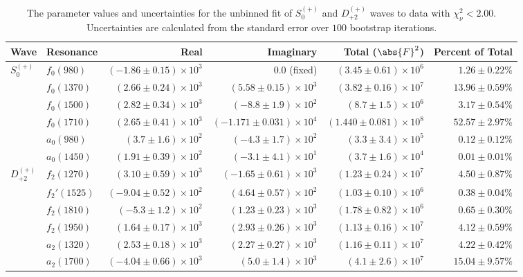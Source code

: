\begin{table}[ht]
    \begin{center}
        \begin{tabular}{llrrrr}\toprule
        Wave & Resonance & Real & Imaginary & Total ($\abs{F}^2$) & Percent of Total \\\midrule
$S_{0}^{(+)}$ & $f_{0}(980)$ & $(-1.86 \pm 0.15) \times 10^{3}$ & $0.0$ (fixed) & $(3.45 \pm 0.61) \times 10^{6}$ & $1.26 \pm 0.22 \%$ \\
 & $f_{0}(1370)$ & $(2.66 \pm 0.24) \times 10^{3}$ & $(5.58 \pm 0.15) \times 10^{3}$ & $(3.82 \pm 0.16) \times 10^{7}$ & $13.96 \pm 0.59 \%$ \\
 & $f_{0}(1500)$ & $(2.82 \pm 0.34) \times 10^{3}$ & $(-8.8 \pm 1.9) \times 10^{2}$ & $(8.7 \pm 1.5) \times 10^{6}$ & $3.17 \pm 0.54 \%$ \\
 & $f_{0}(1710)$ & $(2.65 \pm 0.41) \times 10^{3}$ & $(-1.171 \pm 0.031) \times 10^{4}$ & $(1.440 \pm 0.081) \times 10^{8}$ & $52.57 \pm 2.97 \%$ \\
 & $a_{0}(980)$ & $(3.7 \pm 1.6) \times 10^{2}$ & $(-4.3 \pm 1.7) \times 10^{2}$ & $(3.3 \pm 3.4) \times 10^{5}$ & $0.12 \pm 0.12 \%$ \\
 & $a_{0}(1450)$ & $(1.91 \pm 0.39) \times 10^{2}$ & $(-3.1 \pm 4.1) \times 10^{1}$ & $(3.7 \pm 1.6) \times 10^{4}$ & $0.01 \pm 0.01 \%$ \\
$D_{+2}^{(+)}$ & $f_{2}(1270)$ & $(3.10 \pm 0.59) \times 10^{3}$ & $(-1.65 \pm 0.61) \times 10^{3}$ & $(1.23 \pm 0.24) \times 10^{7}$ & $4.50 \pm 0.87 \%$ \\
 & $f_{2}'(1525)$ & $(-9.04 \pm 0.52) \times 10^{2}$ & $(4.64 \pm 0.57) \times 10^{2}$ & $(1.03 \pm 0.10) \times 10^{6}$ & $0.38 \pm 0.04 \%$ \\
 & $f_{2}(1810)$ & $(-5.3 \pm 1.2) \times 10^{2}$ & $(1.23 \pm 0.23) \times 10^{3}$ & $(1.78 \pm 0.82) \times 10^{6}$ & $0.65 \pm 0.30 \%$ \\
 & $f_{2}(1950)$ & $(1.64 \pm 0.17) \times 10^{3}$ & $(2.93 \pm 0.26) \times 10^{3}$ & $(1.13 \pm 0.16) \times 10^{7}$ & $4.12 \pm 0.59 \%$ \\
 & $a_{2}(1320)$ & $(2.53 \pm 0.18) \times 10^{3}$ & $(2.27 \pm 0.27) \times 10^{3}$ & $(1.16 \pm 0.11) \times 10^{7}$ & $4.22 \pm 0.42 \%$ \\
 & $a_{2}(1700)$ & $(-4.04 \pm 0.66) \times 10^{3}$ & $(5.0 \pm 1.4) \times 10^{3}$ & $(4.1 \pm 2.6) \times 10^{7}$ & $15.04 \pm 9.57 \%$ \\\bottomrule
        \end{tabular}
    \caption{The parameter values and uncertainties for the unbinned fit of $S_{0}^{(+)}$ and $D_{+2}^{(+)}$ waves to data with $\chi^2_\nu < 2.00$. Uncertainties are calculated from the standard error over $100$ bootstrap iterations.}\label{tab:unbinned-fit-chisqdof-2.0-Sp0p-Dp2p}
    \end{center}
\end{table}
